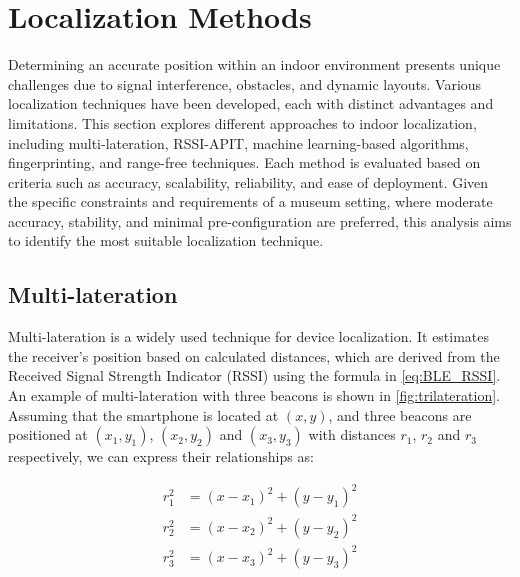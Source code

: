 \section{Localization Methods}
\samepage 
Determining an accurate position within an indoor environment presents unique challenges due to signal interference, obstacles, and dynamic layouts. Various localization techniques have been developed, each with distinct advantages and limitations. This section explores different approaches to indoor localization, including multi-lateration, RSSI-APIT, machine learning-based algorithms, fingerprinting, and range-free techniques. Each method is evaluated based on criteria such as accuracy, scalability, reliability, and ease of deployment. Given the specific constraints and requirements of a museum setting, where moderate accuracy, stability, and minimal pre-configuration are preferred, this analysis aims to identify the most suitable localization technique. 

\subsection{Multi-lateration}

Multi-lateration is a widely used technique for device localization. It estimates the receiver's position based on calculated distances, which are derived from the Received Signal Strength Indicator (RSSI) using the formula in \autoref{eq:BLE_RSSI}.  
An example of multi-lateration with three beacons is shown in \autoref{fig:trilateration}. Assuming that the smartphone is located at $(x,y)$, and three beacons are positioned at $(x_1,y_1)$, $(x_2,y_2)$ and $(x_3,y_3)$ with distances $r_1$, $r_2$ and $r_3$ respectively, we can express their relationships as:

\begin{equation}
    \begin{split}
        r^{2}_{1} & = (x - x_1)^2 + (y - y_1)^2 \\
        r^{2}_{2} & = (x - x_2)^2 + (y - y_2)^2 \\
        r^{2}_{3} & = (x - x_3)^2 + (y - y_3)^2
    \end{split}
\end{equation}

